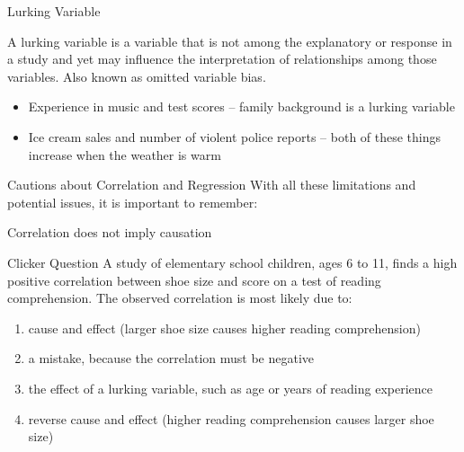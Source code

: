 \documentclass{beamer}
\begin{document}
\begin{frame}{Lurking Variable}
	
	A \alert{lurking variable} is a variable that is not among the explanatory or response in a study and yet may influence the interpretation of relationships among those variables. Also known as omitted variable bias.
	\begin{itemize}
		\item Experience in music and test scores -- family background is a lurking variable
		\item Ice cream sales and number of violent police reports -- both of these things increase when the weather is warm
	\end{itemize}
	
\end{frame}



\begin{frame}{Cautions about Correlation and Regression}
	With all these limitations and potential issues, it is important to remember:
	\begin{center}
		\Large{\alert{Correlation does not imply causation}}
	\end{center}
\end{frame}



\begin{frame}{Clicker Question}
	A study of elementary school children, ages 6 to 11, finds a high positive correlation between shoe size and score on a test of reading comprehension. The observed correlation is most likely due to:
	\begin{enumerate}[label=(\alph*)]
		\item cause and effect (larger shoe size causes higher reading comprehension)
		\item a mistake, because the correlation must be negative
		\item the effect of a lurking variable, such as age or years of reading experience
		\item reverse cause and effect (higher reading comprehension causes larger shoe size)
	\end{enumerate}
\end{frame}
\end{document}

